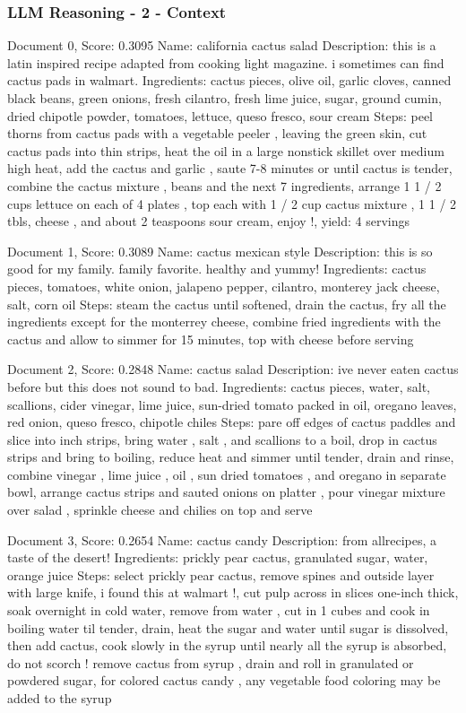 \documentclass[a4paper,11pt]{article}
\begin{document}
\subsubsection{LLM Reasoning - 2 - Context}
Document 0, Score: 0.3095
Name: california cactus salad
Description: this is a latin inspired recipe adapted from cooking light magazine. i sometimes can find cactus pads in walmart.
Ingredients: cactus pieces, olive oil, garlic cloves, canned black beans, green onions, fresh cilantro, fresh lime juice, sugar, ground cumin, dried chipotle powder, tomatoes, lettuce, queso fresco, sour cream
Steps: peel thorns from cactus pads with a vegetable peeler , leaving the green skin, cut cactus pads into thin strips, heat the oil in a large nonstick skillet over medium high heat, add the cactus and garlic , saute 7-8 minutes or until cactus is tender, combine the cactus mixture , beans and the next 7 ingredients, arrange 1 1 / 2 cups lettuce on each of 4 plates , top each with 1 / 2 cup cactus mixture , 1 1 / 2 tbls, cheese , and about 2 teaspoons sour cream, enjoy !, yield: 4 servings

Document 1, Score: 0.3089
Name: cactus mexican style
Description: this is so good for my family. family favorite. healthy and yummy!
Ingredients: cactus pieces, tomatoes, white onion, jalapeno pepper, cilantro, monterey jack cheese, salt, corn oil
Steps: steam the cactus until softened, drain the cactus, fry all the ingredients except for the monterrey cheese, combine fried ingredients with the cactus and allow to simmer for 15 minutes, top with cheese before serving

Document 2, Score: 0.2848
Name: cactus salad
Description: ive never eaten cactus before but this does not sound to bad.
Ingredients: cactus pieces, water, salt, scallions, cider vinegar, lime juice, sun-dried tomato packed in oil, oregano leaves, red onion, queso fresco, chipotle chiles
Steps: pare off edges of cactus paddles and slice into inch strips, bring water , salt , and scallions to a boil, drop in cactus strips and bring to boiling, reduce heat and simmer until tender, drain and rinse, combine vinegar , lime juice , oil , sun dried tomatoes , and oregano in separate bowl, arrange cactus strips and sauted onions on platter , pour vinegar mixture over salad , sprinkle cheese and chilies on top and serve

Document 3, Score: 0.2654
Name: cactus candy
Description: from allrecipes, a taste of the desert!
Ingredients: prickly pear cactus, granulated sugar, water, orange juice
Steps: select prickly pear cactus, remove spines and outside layer with large knife, i found this at walmart !, cut pulp across in slices one-inch thick, soak overnight in cold water, remove from water , cut in 1 cubes and cook in boiling water til tender, drain, heat the sugar and water until sugar is dissolved, then add cactus, cook slowly in the syrup until nearly all the syrup is absorbed, do not scorch ! remove cactus from syrup , drain and roll in granulated or powdered sugar, for colored cactus candy , any vegetable food coloring may be added to the syrup
\end{document}

